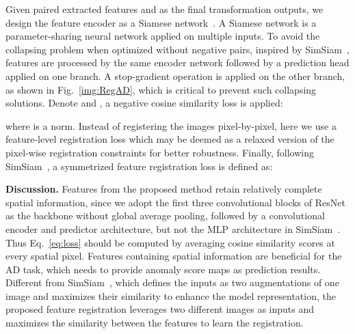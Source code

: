 \documentclass[runningheads]{llncs}
\begin{document}
Given paired extracted features  and  as the final transformation outputs, we design the feature encoder as a Siamese network~\cite{bromley1993signature}. A Siamese network is a parameter-sharing neural network applied on multiple inputs. To avoid the collapsing problem when optimized without negative pairs, inspired by SimSiam~\cite{chen2021exploring}, features are processed by the same encoder network  followed by a prediction head  applied on one branch. A stop-gradient operation is applied on the other branch, as shown in Fig.~\ref{img:RegAD}, which is critical to prevent such collapsing solutions. Denote  and , a negative cosine similarity loss is applied:

where  is a  norm. 
Instead of registering the images pixel-by-pixel, here we use a feature-level registration loss which may be deemed as a relaxed version of the pixel-wise registration constraints for better robustness. Finally, following SimSiam~\cite{chen2021exploring}, a symmetrized feature registration loss is defined as:


\textbf{Discussion.}  
Features from the proposed method retain relatively complete spatial information, since we adopt the first three convolutional blocks of ResNet as the backbone without global average pooling, followed by a convolutional encoder and predictor architecture, but not the MLP architecture in SimSiam~\cite{chen2021exploring}. Thus Eq.~\eqref{eq:loss} should be computed by averaging cosine similarity scores at every spatial pixel. Features containing spatial information are beneficial for the AD task, which needs to provide anomaly score maps as prediction results. Different from SimSiam~\cite{chen2021exploring}, which defines the inputs as two augmentations of one image and maximizes their similarity to enhance the model representation, the proposed feature registration leverages two different images as inputs and maximizes the similarity between the features to learn the registration. 
\end{document}

